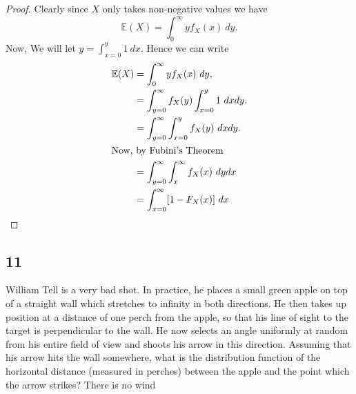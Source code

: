 \documentclass{article}
\newcommand{\E}[1]{\mathbb{E}(#1)}
\begin{document}
\begin{proof}
    Clearly since $X$ only takes non-negative values we have
    \begin{equation*}
        \E{X} = \int_0^\infty yf_X (x) \ dy.
    \end{equation*}
    Now, We will let $y = \int_{x = 0}^y 1 \ dx$. Hence we can write
    \begin{align*}
        \E{X} & = \int_0^\infty yf_X (x) \ dy,                       \\
              & = \int_{y = 0}^\infty f_X(y) \int_{x=0}^y 1 \ dx dy. \\
              & = \int_{y = 0}^\infty \int_{x=0}^y f_X(y) \ dxdy.    \\
        \intertext{Now, by Fubini's Theorem}
              & = \int_{y=0}^\infty \int_{x}^\infty f_X(x) \ dydx    \\
              & = \int_{x=0}^\infty [1 - F_X(x)] \ dx
    \end{align*}
\end{proof}

\subsection*{11} %
William Tell is a very bad shot. In practice, he places a small green apple on
top of a straight wall which stretches to infinity in both directions.
He then takes up position at a distance of one perch from the apple, so that
his line of sight to the target is perpendicular to the wall. He now selects
an angle uniformly at random from his entire field of view and shoots his arrow
in this direction. Assuming that his arrow hits the wall somewhere, what
is the distribution function of the horizontal distance (measured in perches)
between the apple and the point which the arrow strikes? There is no wind
\end{document}
